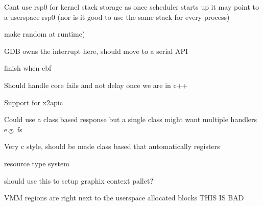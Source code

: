 \begin{DoxyRefList}
%
Cant use rsp0 for kernel stack storage as once scheduler starts up it may point to a userspace rsp0 (nor is it good to use the same stack for every process) 
\item[Member \doxylink{cplusplus_8h_abb3081cb189761f95ff9b7c0bb8abf30}{Max\+OS\+::runtime\+::\+\_\+\+\_\+stack\+\_\+chk\+\_\+guard} ]\label{todo__todo000018}%
%
make random at runtime)  
\item[Member \doxylink{classMaxOS_1_1runtime_1_1GDBServer_a26086b0760f54d1dd70123a5164564a3}{Max\+OS\+::runtime\+::GDBServer\+::GDBServer} (\doxylink{classMaxOS_1_1console_1_1SerialConsole}{console\+::\+Serial\+Console} \texorpdfstring{$\ast$}{*}serial)]\label{todo__todo000055}%
%
GDB owns the interrupt here, should move to a serial API  
\item[Class \doxylink{classMaxOS_1_1runtime_1_1KASanHandler}{Max\+OS\+::runtime\+::KASan\+Handler} ]\label{todo__todo000020}%
%
finish when cbf  
\item[Member \doxylink{classMaxOS_1_1system_1_1Core_a35cbdbb9c1e6716be75f57256c508333}{Max\+OS\+::system\+::Core\+::wake\+\_\+up} (\doxylink{classMaxOS_1_1system_1_1CPU}{CPU} \texorpdfstring{$\ast$}{*}cpu)]\label{todo__todo000057}%
%
Should handle core fails and not delay once we are in c++  
\item[Member \doxylink{classMaxOS_1_1system_1_1CPU_ab818085df41f77a2e7611e7f1c58e57e}{Max\+OS\+::system\+::CPU\+::find\+\_\+cores} () const]\label{todo__todo000058}%
%
Support for x2apic  
\item[Member \doxylink{syscalls_8h_a2bbff8c2e565180b9baa53c02b018ed5}{Max\+OS\+::system\+::syscall\+\_\+func\+\_\+t} )(syscall\+\_\+args\+\_\+t \texorpdfstring{$\ast$}{*}args)]\label{todo__todo000022}%
%
Could use a class based response but a single class might want multiple handlers e.\+g. fs  
\item[Class \doxylink{classMaxOS_1_1system_1_1SyscallManager}{Max\+OS\+::system\+::Syscall\+Manager} ]\label{todo__todo000023}%
%
Very c style, should be made class based that automatically registers  
\item[Member \doxylink{classMaxOS_1_1system_1_1SyscallManager_a82073421a621599b7203bb689a52b1e2}{Max\+OS\+::system\+::Syscall\+Manager\+::syscall\+\_\+resource\+\_\+registry\+\_\+create} (syscall\+\_\+args\+\_\+t \texorpdfstring{$\ast$}{*}args)]\label{todo__todo000059}%
%
resource type system 
\item[Struct \doxylink{structmultiboot__tag__framebuffer}{multiboot\+\_\+tag\+\_\+framebuffer} ]\label{todo__todo000021}%
%
should use this to setup graphix context pallet?  
\item[File \doxylink{virtual_8cpp}{virtual.cpp} ]\label{todo__todo000035}%
%
VMM regions are right next to the userspace allocated blocks THIS IS BAD 
\end{DoxyRefList}